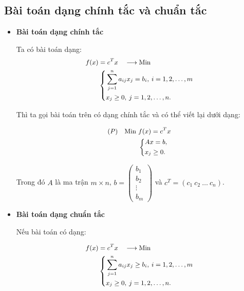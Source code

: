 \documentclass[12pt,a4paper]{report}
\begin{document}
 

\subsection{Bài toán dạng chính tắc và chuẩn tắc}
\begin{itemize}
    \item \textbf{Bài toán dạng chính tắc}
    
    Ta có bài toán dạng:
    \begin{equation} \small \label{F}
        \begin{split}
        f(x) & = c^Tx \quad \longrightarrow \text{Min} \\
            & \left\{
            \begin{split}
            & \sum _{j=1}^n a_{ij} x_j = b_i, \: i=1,2,\ldots,m \\
            & x_j \geq 0, \: j=1,2,\ldots,n.
            \end{split}
            \right.    
        \end{split}
    \end{equation}

    Thì ta gọi bài toán trên có dạng chính tắc và có thể viết lại dưới dạng:

    \begin{equation} \small \label{chinhtac}
        \begin{split}
        (P) \quad \text{Min } & f(x) = c^Tx \\
            & \left\{
            \begin{split}
            & Ax=b, \\
            & x_j \geq 0.
            \end{split}
            \right.    
        \end{split}
    \end{equation}

    Trong đó $A$ là ma trận $m\times n$, $b=\begin{pmatrix}
        b_1 \\
        b_2 \\
        \vdots \\
        b_m
        \end{pmatrix}$ và $c^T=(c_1 \: c_2 \: \ldots \: c_n)$.

    \item \textbf{Bài toán dạng chuẩn tắc}
    
    Nếu bài toán có dạng:

    \begin{equation} \small \label{F}
        \begin{split}
        f(x) & = c^Tx \quad \longrightarrow \text{Min} \\
            & \left\{
            \begin{split}
            & \sum _{j=1}^n a_{ij} x_j \geq b_i, \: i=1,2,\ldots,m \\
            & x_j \geq 0, \: j=1,2,\ldots,n.
            \end{split}
            \right.    
        \end{split}
    \end{equation}


\end{itemize}
\end{document}
